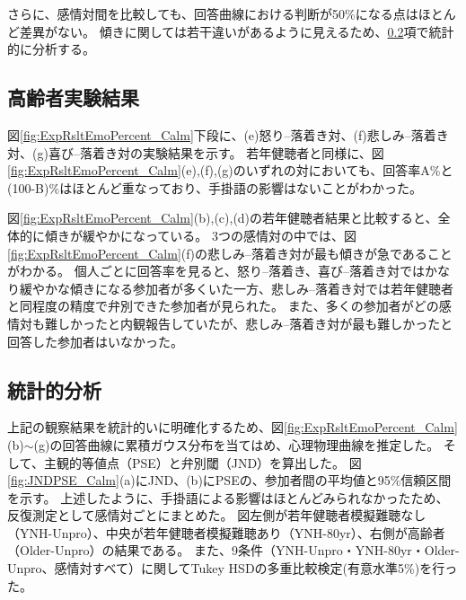 さらに、感情対間を比較しても、回答曲線における判断が50\%になる点はほとんど差異がない。
傾きに関しては若干違いがあるように見えるため、\ref{sec:Statistics_Calm}項で統計的に分析する。

\subsection{高齢者実験結果}
図\ref{fig:ExpRsltEmoPercent_Calm}下段に、(e)怒り--落着き対、(f)悲しみ--落着き対、(g)喜び--落着き対の実験結果を示す。
若年健聴者と同様に、図\ref{fig:ExpRsltEmoPercent_Calm}(e),(f),(g)のいずれの対においても、回答率A\%と(100-B)\%はほとんど重なっており、手掛語の影響はないことがわかった。

図\ref{fig:ExpRsltEmoPercent_Calm}(b),(c),(d)の若年健聴者結果と比較すると、全体的に傾きが緩やかになっている。
3つの感情対の中では、図\ref{fig:ExpRsltEmoPercent_Calm}(f)の悲しみ--落着き対が最も傾きが急であることがわかる。
個人ごとに回答率を見ると、怒り--落着き、喜び--落着き対ではかなり緩やかな傾きになる参加者が多くいた一方、悲しみ--落着き対では若年健聴者と同程度の精度で弁別できた参加者が見られた。
また、多くの参加者がどの感情対も難しかったと内観報告していたが、悲しみ--落着き対が最も難しかったと回答した参加者はいなかった。









\clearpage
\subsection{統計的分析}
\label{sec:Statistics_Calm}
上記の観察結果を統計的いに明確化するため、図\ref{fig:ExpRsltEmoPercent_Calm}(b)$\sim$(g)の回答曲線に累積ガウス分布を当てはめ、心理物理曲線を推定した。
そして、主観的等値点（PSE）と弁別閾（JND）を算出した。
図\ref{fig:JNDPSE_Calm}(a)にJND、(b)にPSEの、参加者間の平均値と95\%信頼区間を示す。
上述したように、手掛語による影響はほとんどみられなかったため、反復測定として感情対ごとにまとめた。
図左側が若年健聴者模擬難聴なし（YNH-Unpro）、中央が若年健聴者模擬難聴あり（YNH-80yr）、右側が高齢者（Older-Unpro）の結果である。
また、9条件（YNH-Unpro・YNH-80yr・Older-Unpro、感情対すべて）に関してTukey HSDの多重比較検定(有意水準5\%)を行った。

